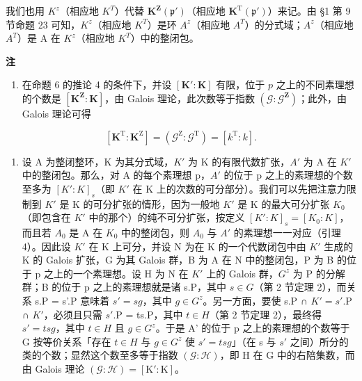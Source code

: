 我们也用 \(K^{z}\)（相应地 \(K^{T}\)）代替 \(\mathbf{K}^{\mathbf{Z}}(\mathfrak{p}')\)（相应地 \(\mathbf{K}^{\mathrm{T}}(\mathfrak{p}')\)）来记。由 §1 第 9 节命题 23 可知，\(K^{z}\)（相应地 \(K^{T}\)）是环 \(A^{z}\)（相应地 \(A^{T}\)）的分式域；\(A^{z}\)（相应地 \(A^{T}\)）是 A 在 \(K^{z}\)（相应地 \(K^{T}\)）中的整闭包。

\textbf{注}\par

\begin{enumerate}
\def\labelenumi{(\arabic{enumi})}
\setcounter{enumi}{2}
\tightlist
\item
  在命题 6 的推论 4 的条件下，并设 \([\mathbf{K}':\mathbf{K}]\) 有限，位于 \(p\) 之上的不同素理想的个数是 \([\mathbf{K}^{\mathbf{Z}}:\mathbf{K}]\)，由 Galois 理论，此次数等于指数 \((\mathcal{G}:\mathcal{G}^{\mathbf{Z}})\)；此外，由 Galois 理论可得
\end{enumerate}

\[
[ \mathbf {K} ^ {\mathrm{T}}: \mathbf {K} ^ {\mathrm{Z}} ] = (\mathcal {G} ^ {\mathrm{Z}}: \mathcal {G} ^ {\mathrm{T}}) = [ k ^ {\mathrm{T}}: k ].\tag{6}
\]

\begin{enumerate}
\def\labelenumi{(\arabic{enumi})}
\setcounter{enumi}{3}
\tightlist
\item
  设 A 为整闭整环，K 为其分式域，\(K'\) 为 K 的有限代数扩张，\(A'\) 为 A 在 \(K'\) 中的整闭包。那么，对 A 的每个素理想 p，\(A'\) 的位于 p 之上的素理想的个数至多为 \([K':K]_{s}\)（即 \(K'\) 在 K 上的次数的可分部分）。我们可以先把注意力限制到 \(K'\) 是 K 的可分扩张的情形，因为一般地 \(K'\) 是 K 的最大可分扩张 \(K_{0}\)（即包含在 \(K'\) 中的那个）的纯不可分扩张，按定义 \([K':K]_{s} = [K_{0}:K]\)，而且若 \(A_{0}\) 是 A 在 \(K_{0}\) 中的整闭包，则 \(A_{0}\) 与 \(A'\) 的素理想一一对应（引理 4）。因此设 \(K'\) 在 K 上可分，并设 N 为在 K 的一个代数闭包中由 \(K'\) 生成的 K 的 Galois 扩张，G 为其 Galois 群，B 为 A 在 N 中的整闭包，P 为 B 的位于 p 之上的一个素理想。设 H 为 N 在 \(K'\) 上的 Galois 群，\(G^{z}\) 为 P 的分解群；B 的位于 p 之上的素理想就是诸 s.P，其中 \(s \in G\)（第 2 节定理 2），而关系 s.P = s'.P 意味着 \(s' = sg\)，其中 \(g \in G^{z}\)。另一方面，要使 s.P ∩ \(K' = s'\).P ∩ \(K'\)，必须且只需 \(s'\).P = ts.P，其中 \(t \in H\)（第 2 节定理 2），最终得 \(s' = tsg\)，其中 \(t \in H\) 且 \(g \in G^{z}\)。于是 A' 的位于 p 之上的素理想的个数等于 G 按等价关系「存在 \(t \in H\) 与 \(g \in G^{z}\) 使 \(s' = tsg\)」（在 s 与 \(s'\) 之间）所分的类的个数；显然这个数至多等于指数 \((\mathcal{G}:\mathcal{H})\)，即 H 在 G 中的右陪集数，而由 Galois 理论 \((\mathcal{G}:\mathcal{H}) = [\mathrm{K}':\mathrm{K}]\)。
\end{enumerate}

